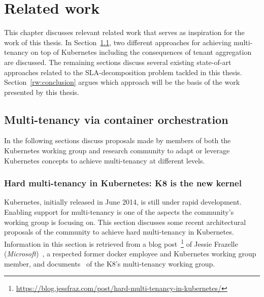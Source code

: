 \chapter{Related work}
\label{ch:related}
This chapter discusses relevant related work that serves as inspiration for the work of this thesis. In Section~\ref{rw:multi-tenancy}, two different approaches for achieving multi-tenancy on top of Kubernetes including the consequences of tenant aggregation are discussed. The remaining sections discuss several existing state-of-art approaches related to the SLA-decomposition problem tackled in this thesis.  Section~\ref{rw:conclusion} argues which approach will be the basis of the work presented by this thesis. 
\section{Multi-tenancy via container orchestration}
\label{rw:multi-tenancy}
In the following sections discuss proposals made by members of both the Kubernetes working group and research community to adapt or leverage Kubernetes concepts to achieve multi-tenancy at different levels. 
\subsection{Hard multi-tenancy in Kubernetes: K8 is the new kernel}
Kubernetes, initially released in June 2014, is still under rapid development. Enabling support for multi-tenancy is one of the aspects the community's working group is focusing on. This section discusses some recent architectural proposals of the community to achieve hard multi-tenancy in Kubernetes. Information in this section is retrieved from a blog post~\footnote{\url{https://blog.jessfraz.com/post/hard-multi-tenancy-in-kubernetes/}} of Jessie Frazelle (\textit{Microsoft})~\cite{hardmultiproposals}, a respected former docker employee and Kubernetes working group member, and documents~\cite{hardmulti} of the K8's multi-tenancy working group. 

